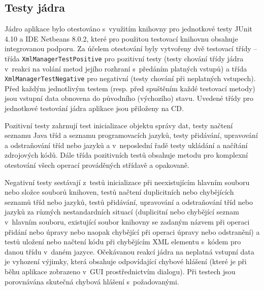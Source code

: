 \documentclass[czech,BP]{thesiskiv}
\begin{document}
\subsection{Testy jádra}
Jádro aplikace bylo otestováno s~využitím knihovny pro jednotkové testy JUnit 4.10 a IDE Netbeans 8.0.2, které pro použitou testovací knihovnu obsahuje integrovanou podporu. Za účelem otestování byly vytvořeny dvě testovací třídy -- třída \texttt{XmlManagerTestPositive} pro pozitivní testy (testy chování třídy jádra v~reakci na volání metod jejího rozhraní s~předáním platných vstupů) a třída \texttt{XmlManagerTestNegative} pro negativní (testy chování při neplatných vstupech). Před každým jednotlivým testem (resp. před spuštěním každé testovací metody) jsou vstupní data obnovena do původního (výchozího) stavu. Uvedené třídy pro jednotkové testování jádra aplikace jsou přiloženy na CD.\par
Pozitivní testy zahrnují test inicializace objektu správy dat, testy načtení seznamu Java tříd a seznamu programovacích jazyků, testy přidávání, upravování a odstraňování tříd nebo jazyků a v~neposlední řadě testy ukládání a načítání zdrojových kódů. Dále třída pozitivních testů obsahuje metodu pro komplexní otestování všech operací prováděných střídavě a opakovaně.\par
Negativní testy sestávají z~testů inicializace při neexistujícím hlavním souboru nebo složce souborů knihoven, testů načtení duplicitních nebo chybějících seznamů tříd nebo jazyků, testů přidávání, upravování a odstraňování tříd nebo jazyků za různých nestandardních situací (duplicitní nebo chybějící seznam v~hlavním souboru, existující soubor knihovny se zadaným názvem při operaci přidání nebo úpravy nebo naopak chybějící při operaci úpravy nebo odstranění) a testů uložení nebo načtení kódu při chybějícím XML elementu s~kódem pro danou třídu v~daném jazyce. Očekávanou reakcí jádra na neplatná vstupní data je vyhození výjimky, která obsahuje odpovídající chybové hlášení (které je při běhu aplikace zobrazeno v~GUI prostřednictvím dialogu). Při testech jsou porovnávána skutečná chybová hlášení s~požadovanými.
\end{document}
